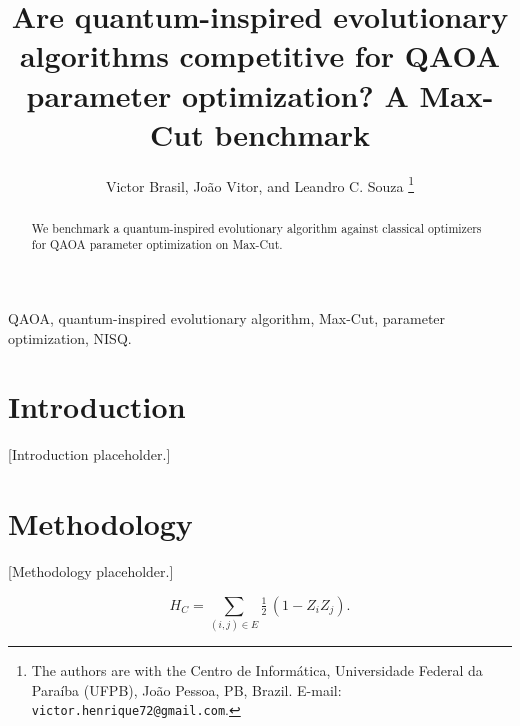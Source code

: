 \documentclass{cbctq}
\begin{document}
\title{Are quantum-inspired evolutionary algorithms competitive for QAOA
parameter optimization? A Max-Cut benchmark}

\author{
Victor Brasil, João Vitor, and Leandro C. Souza%
\thanks{
The authors are with the Centro de Informática, Universidade Federal da
Paraíba (UFPB), João Pessoa, PB, Brazil.
E-mail: \texttt{victor.henrique72@gmail.com}.
}
}

\maketitle


\begin{abstract}
We benchmark a quantum-inspired evolutionary algorithm against classical optimizers for QAOA parameter optimization on Max-Cut.
\end{abstract}

\begin{keywords}
QAOA, quantum-inspired evolutionary algorithm, Max-Cut, parameter optimization, NISQ.
\end{keywords}

\section{Introduction}
[Introduction placeholder.]

\section{Methodology}
[Methodology placeholder.]

\begin{equation}
H_C = \sum_{(i,j)\in E} \tfrac{1}{2}\,(1 - Z_i Z_j).
\end{equation}
\end{document}
